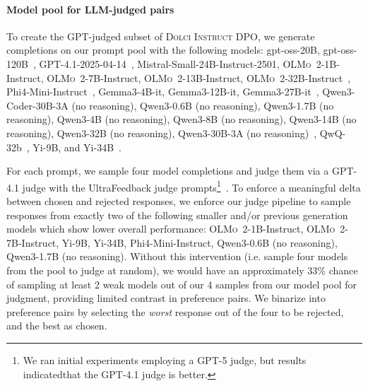 \documentclass[table]{ai2style/ai2}
\newcommand{\oldOlmo}{OLMo\xspace}
\newcommand{\olmotoo}{\textsc{\oldOlmo~2}\xspace}
\newcommand{\dolciinstructdpo}{\textsc{Dolci Instruct DPO}\xspace}
\begin{document}
{{\paragraph{Model pool for LLM-judged pairs} To create the GPT-judged subset of \dolciinstructdpo, we generate completions on our prompt pool with the following models: gpt-oss-20B, gpt-oss-120B~\citep{agarwal2025gpt}, GPT-4.1-2025-04-14~\citep{gpt4}, Mistral-Small-24B-Instruct-2501, \olmotoo-1B-Instruct, \olmotoo-7B-Instruct, \olmotoo-13B-Instruct, \olmotoo-32B-Instruct~\citep{olmo20242olmo2furious}, Phi4-Mini-Instruct~\citep{Abdin2024Phi4TR}, Gemma3-4B-it, Gemma3-12B-it, Gemma3-27B-it~\citep{team2025gemma3}, Qwen3-Coder-30B-3A (no reasoning), Qwen3-0.6B (no reasoning), Qwen3-1.7B (no reasoning), Qwen3-4B (no reasoning), Qwen3-8B (no reasoning), Qwen3-14B (no reasoning), Qwen3-32B (no reasoning), Qwen3-30B-3A (no reasoning)~\citep{qwen3},  QwQ-32b~\citep{qwen_qwq_32b_2025}, Yi-9B, and Yi-34B~\citep{young2024yi}.

For each prompt, we sample four model completions and judge them via a GPT-4.1 judge with the UltraFeedback judge prompts\footnote{We ran initial experiments employing a GPT-5 judge, but results indicatedthat the GPT-4.1 judge is better.}~\citep{lambert2024tulu3,cui2023ultrafeedback}. To enforce a meaningful delta between chosen and rejected responses, we enforce our judge pipeline to sample responses from exactly two of the following smaller and/or previous generation models which show lower overall performance: \olmotoo-1B-Instruct, \olmotoo-7B-Instruct, Yi-9B, Yi-34B, Phi4-Mini-Instruct,
Qwen3-0.6B (no reasoning), Qwen3-1.7B (no reasoning). Without this intervention (i.e. sample four models from the pool to judge at random), we would have an approximately 33\% chance of sampling at least 2 weak models out of our 4 samples from our model pool for judgment, providing limited contrast in preference pairs. We binarize into preference pairs by selecting the \textit{worst} response out of the four to be rejected, and the best as chosen.

}}
\end{document}
